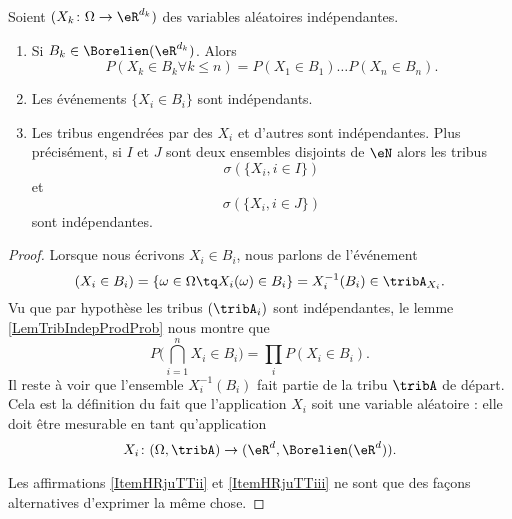 \begin{proposition} \label{PropMLbfRTk}
    Soient \( (X_k\colon \Omega\to \eR^{d_k})\) des variables aléatoires indépendantes.
    \begin{enumerate}
        \item
            Si \( B_k\in \Borelien(\eR^{d_k})\). Alors
    \begin{equation}
        P(X_k\in B_k\forall k\leq n)=P(X_1\in B_1)\ldots P(X_n\in B_n).
    \end{equation}
\item\label{ItemHRjuTTii}
    Les événements \( \{   X_i\in B_i   \}\) sont indépendants.
\item\label{ItemHRjuTTiii}
    Les tribus engendrées par des \( X_i\) et d'autres sont indépendantes. Plus précisément, si \( I\) et \( J\) sont deux ensembles disjoints de \( \eN\) alors les tribus 
    \begin{equation}
        \sigma(  \{ X_i,i\in I \}  )
    \end{equation}
    et
    \begin{equation}
        \sigma(  \{ X_i,i\in J \}  )
    \end{equation}
    sont indépendantes.
    \end{enumerate}

\end{proposition}

\begin{proof}
    Lorsque nous écrivons \( X_i\in B_i\), nous parlons de l'événement
    \begin{equation}
        (X_i\in B_i)=\{ \omega\in\Omega\tq X_i(\omega)\in B_i \}=X_i^{-1}(B_i)\in \tribA_{X_i}.
    \end{equation}
    Vu que par hypothèse les tribus \( (\tribA_i)\) sont indépendantes, le lemme \ref{LemTribIndepProdProb} nous montre que
    \begin{equation}
        P\big( \bigcap_{i=1}^nX_i\in B_i \big)=\prod_iP(X_i\in B_i).
    \end{equation}
    Il reste à voir que l'ensemble \( X_i^{-1}(B_i)\) fait partie de la tribu \( \tribA\) de départ. Cela est la définition du fait que l'application \( X_i\) soit une variable aléatoire : elle doit être mesurable en tant qu'application
    \begin{equation}
        X_i\colon (\Omega,\tribA)\to (\eR^d,\Borelien(\eR^d)).
    \end{equation}

    Les affirmations \ref{ItemHRjuTTii} et \ref{ItemHRjuTTiii} ne sont que des façons alternatives d'exprimer la même chose.
\end{proof}

